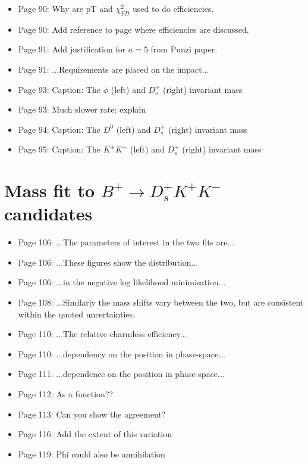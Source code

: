 \documentclass[12pt]{article}
\begin{document}
\begin{itemize}
\item Page 90: {\color{blue}Why are pT and $\chi^{2}_{FD}$ used to do efficiencies.}
\item Page 90: {\color{blue}Add reference to page where efficiencies are discussed.}
\item Page 91: {\color{blue}Add justification for $a=5$ from Punzi paper.}
\item Page 91: ...Requirements are {\color{red}placed} on the impact... 
\item Page 93: Caption: The {\color{red}$\phi$ (left) and $D_{s}^{+}$ (right)} invariant mass
\item Page 93: {\color{blue} Much slower rate: explain}
\item Page 94: Caption: The {\color{red}$D^{0}$ (left) and $D_{s}^{+}$ (right)} invariant mass
\item Page 95: Caption: The {\color{red}$K^+K^-$ (left) and $D_{s}^{+}$ (right)} invariant mass

\end{itemize}
\section{Mass fit to $B^+ \rightarrow D_s^+ K^+K^-$ candidates}

\begin{itemize}
\item Page 106: ...The parameters of interest {\color{red}in the two fits are}...
\item Page 106: ...These figures {\color{red}show} the distribution...
\item Page 106: ...in the {\color{red}negative log likelihood} minimisation...
\item Page 108: ...Similarly the mass shifts vary between the two, {\color{red}but are consistent within the quoted uncertainties.}
\item Page 110: ...{\color{red}The} relative charmless efficiency...
\item Page 110: ...dependency {\color{red}on the position} in phase-space...
\item Page 111: ...dependence on the position {\color{red}in phase-space}...
\item Page 112: {\color{blue} As a function??}
\item Page 113: {\color{blue} Can you show the agreement?}
\item Page 116: {\color{blue}Add the extent of this variation} 
\item Page 119: {\color{blue} Phi could also be annihilation}

\end{itemize}
\end{document}

